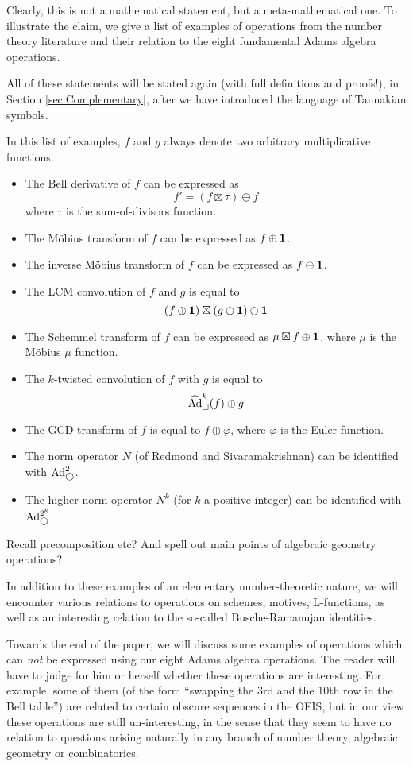 Clearly, this is not a mathematical statement, but a meta-mathematical one. To illustrate the claim, we give a list of examples of operations from the number theory literature and their relation to the eight fundamental Adams algebra operations. 

All of these statements will be stated again (with full definitions and proofs!), in Section \ref{sec:Complementary}, after we have introduced the language of Tannakian symbols.

In this list of examples, $f$ and $g$ always denote two arbitrary multiplicative functions.
\begin{itemize}
\item The Bell derivative of $f$ can be expressed as
$$   f' = (f \boxtimes \tau) \ominus  f  $$  
where $\tau$ is the sum-of-divisors function.
\item The M{\"o}bius transform of $f$ can be expressed as $f \oplus \mathbf{1}$.
\item The inverse M{\"o}bius transform of $f$ can be expressed as $f \ominus \mathbf{1}$.
\item The LCM convolution of $f$ and $g$ is equal to 
$$ (f \oplus \mathbf{1}) \boxtimes (g \oplus \mathbf{1}) \ominus \mathbf{1}    $$
\item The Schemmel transform of $f$ can be expressed as $\mu \boxtimes f \oplus \mathbf{1}$, where $\mu$ is the M{\"o}bius $\mu$ function.
\item The $k$-twisted convolution of $f$ with $g$ is equal to 
$$    \widehat{\text{Ad}}^{k}_{\square}(f) \oplus g   $$
\item The GCD transform of $f$ is equal to $f \oplus \varphi$, where $\varphi$ is the Euler function.
\item The norm operator $N$ (of Redmond and Sivaramakrishnan) can be identified with $\text{Ad}^{2}_{\bigcirc}$.
\item The higher norm operator $N^k$ (for $k$ a positive integer) can be identified with $\text{Ad}^{2^k}_{\bigcirc}$.
\end{itemize}

Recall precomposition etc? And spell out main points of algebraic geometry operations?

In addition to these examples of an elementary number-theoretic nature, we will encounter various relations to operations on schemes, motives, L-functions, as well as an interesting relation to the so-called Busche-Ramanujan identities. 

Towards the end of the paper, we will discuss some examples of operations which can \emph{not} be expressed using our eight Adams algebra operations. The reader will have to judge for him or herself whether these operations are interesting. For example, some of them (of the form ``swapping the 3rd and the 10th row in the Bell table'') are related to certain obscure sequences in the OEIS, but in our view these operations are still un-interesting, in the sense that they seem to have no relation to questions arising naturally in any branch of number theory, algebraic geometry or combinatorics. 

